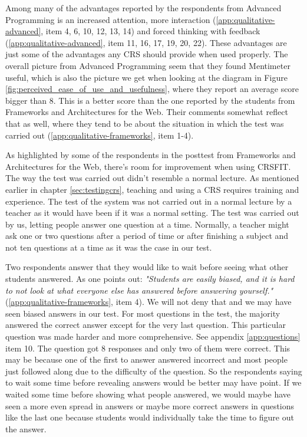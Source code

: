 Among many of the advantages reported by the respondents from Advanced Programming is an increased attention, more interaction (\ref{app:qualitative-advanced}, item 4, 6, 10, 12, 13, 14) and forced thinking with feedback (\ref{app:qualitative-advanced}, item 11, 16, 17, 19, 20, 22). These advantages are just some of the advantages any CRS should provide when used properly. The overall picture from Advanced Programming seem that they found Mentimeter useful, which is also the picture we get when looking at the diagram in Figure \ref{fig:perceived_ease_of_use_and_usefulness}, where they report an average score bigger than 8. This is a better score than the one reported by the students from Frameworks and Architectures for the Web. Their comments somewhat reflect that as well, where they tend to be about the situation in which the test was carried out (\ref{app:qualitative-frameworks}, item 1-4).

As highlighted by some of the respondents in the posttest from Frameworks and Architectures for the Web, there's room for improvement when using CRSFIT. The way the test was carried out didn't resemble a normal lecture. As mentioned earlier in chapter \ref{sec:testingcrs}, teaching and using a CRS requires training and experience. The test of the system was not carried out in a normal lecture by a teacher as it would have been if it was a normal setting. The test was carried out by us, letting people answer one question at a time. Normally, a teacher might ask one or two questions after a period of time or after finishing a subject and not ten questions at a time as it was the case in our test.

Two respondents answer that they would like to wait before seeing what other students answered. As one points out: \emph{"Students are easily biased, and it is hard to not look at what everyone else has answered before answering yourself."} (\ref{app:qualitative-frameworks}, item 4). We will not deny that and we may have seen biased answers in our test. For most questions in the test, the majority answered the correct answer except for the very last question. This particular question was made harder and more comprehensive. See appendix \ref{app:questions} item 10. The question got 8 responses and only two of them were correct. This may be because one of the first to answer answered incorrect and most people just followed along due to the difficulty of the question. So the respondents saying to wait some time before revealing answers would be better may have point. If we waited some time before showing what people answered, we would maybe have seen a more even spread in answers or maybe more correct answers in questions like the last one because students would individually take the time to figure out the answer. 

